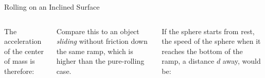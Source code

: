 \documentclass[12pt,compress,aspectratio=169]{beamer}
\begin{document}
\begin{frame}{Rolling on an Inclined Surface}
  \begin{columns}
    

    The acceleration of the center of mass is therefore:


    \vspace{-.1in}Compare this to an object \emph{sliding} without friction
    down the same ramp, which is higher than the pure-rolling case.
    
    
    \vspace{-.2in}If the sphere starts from rest, the speed of the sphere when
    it reaches the bottom of the ramp, a distance $d$ away, would be:

  \end{columns}
\end{frame}
\end{document}
